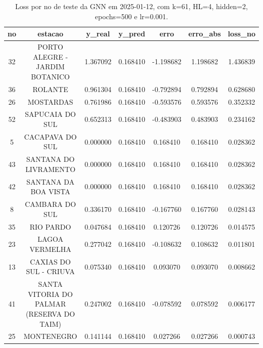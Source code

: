 \begin{table}[h]
\centering
\caption{Loss por no de teste da GNN em 2025-01-12, com k=61, HL=4, hidden=2, epochs=500 e lr=0.001.}
\label{tab:gnn_loss_k61_hl4_h2_e500_d20250112}
\begin{tabular}{ccccccc}
\toprule
no & estacao & y\_real & y\_pred & erro & erro\_abs & loss\_no \\
\midrule
32 & PORTO ALEGRE - JARDIM BOTANICO & 1.367092 & 0.168410 & -1.198682 & 1.198682 & 1.436839 \\
36 & ROLANTE & 0.961304 & 0.168410 & -0.792894 & 0.792894 & 0.628680 \\
26 & MOSTARDAS & 0.761986 & 0.168410 & -0.593576 & 0.593576 & 0.352332 \\
52 & SAPUCAIA DO SUL & 0.652313 & 0.168410 & -0.483903 & 0.483903 & 0.234162 \\
5 & CACAPAVA DO SUL & 0.000000 & 0.168410 & 0.168410 & 0.168410 & 0.028362 \\
43 & SANTANA DO LIVRAMENTO & 0.000000 & 0.168410 & 0.168410 & 0.168410 & 0.028362 \\
42 & SANTANA DA BOA VISTA & 0.000000 & 0.168410 & 0.168410 & 0.168410 & 0.028362 \\
8 & CAMBARA DO SUL & 0.336170 & 0.168410 & -0.167760 & 0.167760 & 0.028143 \\
35 & RIO PARDO & 0.047684 & 0.168410 & 0.120726 & 0.120726 & 0.014575 \\
23 & LAGOA VERMELHA & 0.277042 & 0.168410 & -0.108632 & 0.108632 & 0.011801 \\
13 & CAXIAS DO SUL - CRIUVA & 0.075340 & 0.168410 & 0.093070 & 0.093070 & 0.008662 \\
41 & SANTA VITORIA DO PALMAR (RESERVA DO TAIM) & 0.247002 & 0.168410 & -0.078592 & 0.078592 & 0.006177 \\
25 & MONTENEGRO & 0.141144 & 0.168410 & 0.027266 & 0.027266 & 0.000743 \\
\bottomrule
\end{tabular}
\end{table}
